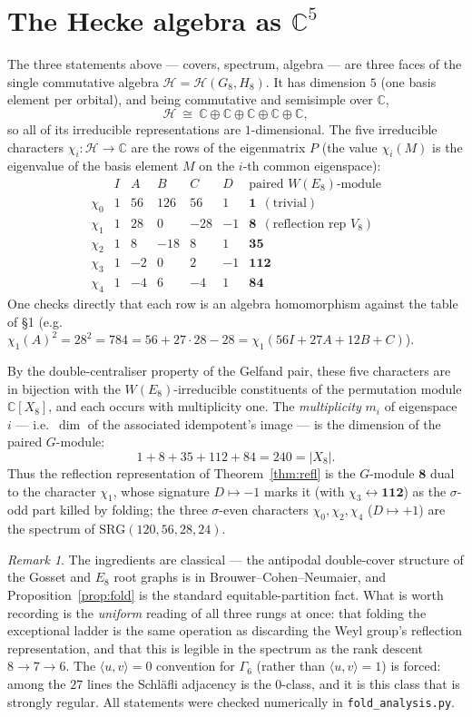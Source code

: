 \documentclass[11pt]{article}
\theoremstyle{remark}
\newtheorem*{remark}{Remark}
\newcommand{\CC}{\mathbb{C}}
\newcommand{\Weyl}{W}
\newcommand{\ip}[2]{\langle #1,#2\rangle}
\begin{document}
\section{The Hecke algebra as $\CC^5$}

The three statements above --- covers, spectrum, algebra --- are three faces of
the single commutative algebra $\mathcal H=\mathcal H(G_8,H_8)$. It has
dimension $5$ (one basis element per orbital), and being commutative and
semisimple over $\CC$,
\[
  \mathcal H\ \cong\ \CC\oplus\CC\oplus\CC\oplus\CC\oplus\CC,
\]
so all of its irreducible representations are $1$-dimensional. The five
irreducible characters $\chi_i:\mathcal H\to\CC$ are the rows of the eigenmatrix
$P$ (the value $\chi_i(M)$ is the eigenvalue of the basis element $M$ on the
$i$-th common eigenspace):
\[
\renewcommand{\arraystretch}{1.1}
\begin{array}{c|ccccc|l}
 & I & A & B & C & D & \text{paired }\Weyl(E_8)\text{-module}\\\hline
\chi_0 & 1 & 56 & 126 & 56 & 1 & \mathbf{1}\ \ (\text{trivial})\\
\chi_1 & 1 & 28 & 0 & -28 & -1 & \mathbf{8}\ \ (\text{reflection rep }V_8)\\
\chi_2 & 1 & 8 & -18 & 8 & 1 & \mathbf{35}\\
\chi_3 & 1 & -2 & 0 & 2 & -1 & \mathbf{112}\\
\chi_4 & 1 & -4 & 6 & -4 & 1 & \mathbf{84}
\end{array}
\]
One checks directly that each row is an algebra homomorphism against the table
of \S1 (e.g.\ $\chi_1(A)^2=28^2=784=56+27\cdot28-28=\chi_1(56I{+}27A{+}12B{+}C)$).

By the double-centraliser property of the Gelfand pair, these five characters
are in bijection with the $\Weyl(E_8)$-irreducible constituents of the
permutation module $\CC[X_8]$, and each occurs with multiplicity one. The
\emph{multiplicity} $m_i$ of eigenspace $i$ --- i.e.\ $\dim$ of the associated
idempotent's image --- is the dimension of the paired $G$-module:
\[
  1+8+35+112+84 = 240 = |X_8|.
\]
Thus the reflection representation of Theorem~\ref{thm:refl} is the $G$-module
$\mathbf 8$ dual to the character $\chi_1$, whose signature $D\mapsto-1$ marks
it (with $\chi_3\leftrightarrow\mathbf{112}$) as the $\sigma$-odd part killed by
folding; the three $\sigma$-even characters $\chi_0,\chi_2,\chi_4$
($D\mapsto+1$) are the spectrum of $\mathrm{SRG}(120,56,28,24)$.

\begin{remark}
The ingredients are classical --- the antipodal double-cover structure of the
Gosset and $E_8$ root graphs is in Brouwer--Cohen--Neumaier, and
Proposition~\ref{prop:fold} is the standard equitable-partition fact. What is
worth recording is the \emph{uniform} reading of all three rungs at once: that
folding the exceptional ladder is the same operation as discarding the Weyl
group's reflection representation, and that this is legible in the spectrum as
the rank descent $8\to7\to6$. The $\ip{u}{v}=0$ convention for $\Gamma_6$ (rather
than $\ip{u}{v}=1$) is forced: among the $27$ lines the Schl\"afli adjacency is
the $0$-class, and it is this class that is strongly regular. All statements
were checked numerically in \texttt{fold\_analysis.py}.
\end{remark}
\end{document}
